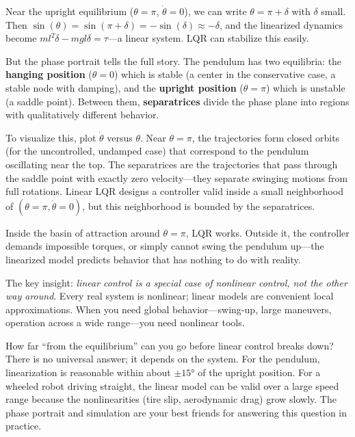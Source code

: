 Near the upright equilibrium ($\theta = \pi$, $\dot{\theta} = 0$), we can write $\theta = \pi + \delta$ with $\delta$ small. Then $\sin(\theta) = \sin(\pi + \delta) = -\sin(\delta) \approx -\delta$, and the linearized dynamics become $ml^2 \ddot{\delta} - mgl\delta = \tau$---a linear system. LQR can stabilize this easily.

But the phase portrait tells the full story. The pendulum has two equilibria: the \textbf{hanging position} ($\theta = 0$) which is stable (a center in the conservative case, a stable node with damping), and the \textbf{upright position} ($\theta = \pi$) which is unstable (a saddle point). Between them, \textbf{separatrices} divide the phase plane into regions with qualitatively different behavior.

To visualize this, plot $\dot{\theta}$ versus $\theta$. Near $\theta = \pi$, the trajectories form closed orbits (for the uncontrolled, undamped case) that correspond to the pendulum oscillating near the top. The separatrices are the trajectories that pass through the saddle point with exactly zero velocity---they separate swinging motions from full rotations. Linear LQR designs a controller valid inside a small neighborhood of $(\theta = \pi, \dot{\theta} = 0)$, but this neighborhood is bounded by the separatrices.

Inside the basin of attraction around $\theta = \pi$, LQR works. Outside it, the controller demands impossible torques, or simply cannot swing the pendulum up---the linearized model predicts behavior that has nothing to do with reality.

The key insight: \textit{linear control is a special case of nonlinear control, not the other way around}. Every real system is nonlinear; linear models are convenient local approximations. When you need global behavior---swing-up, large maneuvers, operation across a wide range---you need nonlinear tools.

How far ``from the equilibrium'' can you go before linear control breaks down? There is no universal answer; it depends on the system. For the pendulum, linearization is reasonable within about $\pm 15°$ of the upright position. For a wheeled robot driving straight, the linear model can be valid over a large speed range because the nonlinearities (tire slip, aerodynamic drag) grow slowly. The phase portrait and simulation are your best friends for answering this question in practice.

